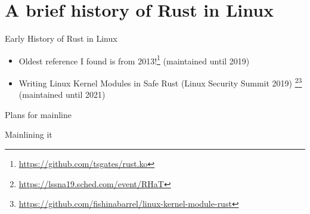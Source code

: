 \section{A brief history of Rust in Linux}

\begin{frame}[c]{Early History of Rust in Linux}
 \begin{itemize}
   \item Oldest reference I found is from 2013!\footnote{\url{https://github.com/tsgates/rust.ko}}
     {\small (maintained until 2019)}
   \pause\item Writing Linux Kernel Modules in Safe Rust (Linux Security Summit 2019)
     \footnote{\url{https://lssna19.sched.com/event/RHaT}}\footnote{\url{https://github.com/fishinabarrel/linux-kernel-module-rust}}
     {\small (maintained until 2021)}
 \end{itemize}
\end{frame}

\begin{frame}[c]{Plans for mainline}
\end{frame}

\begin{frame}[c]{Mainlining it}
\end{frame}
